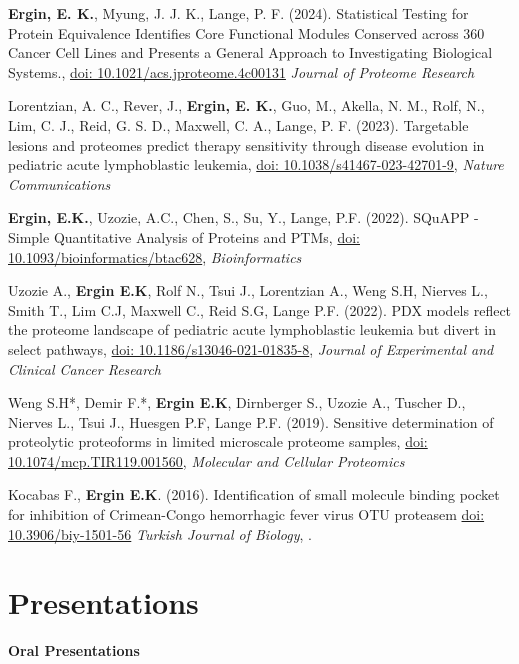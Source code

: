 \documentclass[margin,line]{res}
\begin{document}
\begin{resume}
\vspace*{-.3cm}

{\bf Ergin, E. K.}, Myung, J. J. K., Lange, P. F. (2024). Statistical Testing for Protein Equivalence Identifies Core Functional Modules Conserved across 360 Cancer Cell Lines and Presents a General Approach to Investigating Biological Systems., \href{https://doi.org/10.1021/acs.jproteome.4c00131}{doi: 10.1021/acs.jproteome.4c00131} {\em Journal of Proteome Research}

Lorentzian, A. C., Rever, J., {\bf Ergin, E. K.}, Guo, M., Akella, N. M., Rolf, N., Lim, C. J., Reid, G. S. D., Maxwell, C. A., Lange, P. F. (2023). Targetable lesions and proteomes predict therapy sensitivity through disease evolution in pediatric acute lymphoblastic leukemia, \href{https://doi.org/10.1038/s41467-023-42701-9}{doi: 10.1038/s41467-023-42701-9}, {\em Nature Communications}

{\bf Ergin, E.K.}, Uzozie, A.C., Chen, S., Su, Y., Lange, P.F. (2022). SQuAPP - Simple Quantitative Analysis of Proteins and PTMs, \href{https://doi.org/10.1093/bioinformatics/btac628}{doi: 10.1093/bioinformatics/btac628}, {\em Bioinformatics}

Uzozie A., {\bf Ergin E.K}, Rolf N., Tsui J., Lorentzian A., Weng S.H,  Nierves L., Smith T., Lim C.J,  Maxwell C., Reid S.G, Lange P.F. (2022). PDX models reflect the proteome landscape of pediatric acute lymphoblastic leukemia but divert in select pathways, \href{https://dx.doi.org/10.1186%2Fs13046-021-01835-8}{doi: 10.1186/s13046-021-01835-8}, {\em Journal of Experimental and Clinical Cancer Research}

Weng S.H*, Demir F.*, {\bf Ergin E.K}, Dirnberger S., Uzozie A., Tuscher D., Nierves L., Tsui J., Huesgen P.F, Lange P.F. (2019). Sensitive determination of proteolytic proteoforms in limited microscale proteome samples, \href{https://doi.org/10.1074/mcp.TIR119.001560}{doi: 10.1074/mcp.TIR119.001560}, {\em Molecular and Cellular Proteomics}

Kocabas F., {\bf Ergin E.K}. (2016). Identification of small molecule binding pocket for inhibition of Crimean-Congo hemorrhagic fever virus OTU proteasem \href{https://www.researchgate.net/profile/Fatih_Kocabas/publication/284188739_Identification_of_small_molecule_binding_pocket_for_inhibition_of_Crimean-Congo_hemorrhagic_fever_virus_OTU_protease/links/564f6a0b08aefe619b11de98.pdf}{doi: 10.3906/biy-1501-56} {\em Turkish Journal of Biology}, .


\section{\sc Presentations}
{\bf Oral Presentations}


\end{resume}
\end{document}
